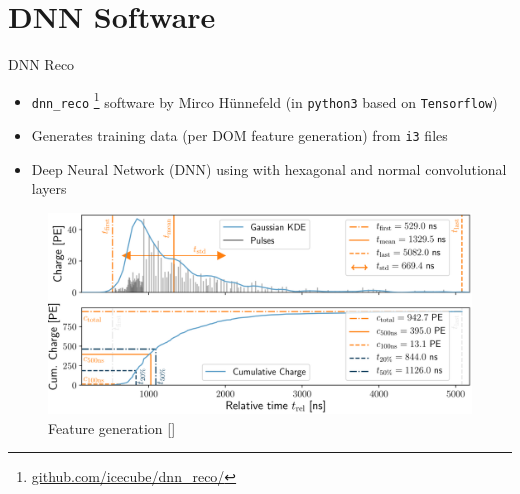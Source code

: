 \section{DNN Software}
\begin{frame}{DNN Reco}
    \begin{itemize}
        \item \texttt{dnn\_reco} \footnote{\href{https://github.com/icecube/dnn_reco/}{github.com/icecube/dnn\_reco/}}
              software by Mirco Hünnefeld (in \texttt{python3} based on \texttt{Tensorflow})
        \item Generates training data (per DOM feature generation) from \texttt{i3} files
        \item Deep Neural Network (DNN) using with hexagonal and normal convolutional layers
    \end{itemize}
    \begin{figure}
        \centering
        \includegraphics[width=.6\textwidth]{media/feature_generation}
        \caption*{Feature generation []}
    \end{figure}
\end{frame}
